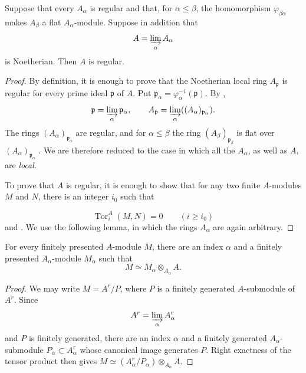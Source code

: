 \begin{proposition}[5.13.7]
\label{IV.5.13.7}
Suppose that every $A_\alpha$ is regular and that, for
$\alpha\leq\beta$, the homomorphism $\varphi_{\beta\alpha}$
makes $A_\beta$ a flat $A_\alpha$-module.  Suppose in addition
that
\[
  A=\varinjlim_\alpha A_\alpha
\]
is Noetherian.  Then $A$ is regular.
\end{proposition}

\begin{proof}
By definition, it is enough to prove that the Noetherian local
ring $A_{\mathfrak p}$ is regular for every prime ideal
$\mathfrak p$ of $A$.  Put $\mathfrak p_\alpha
=\varphi_\alpha^{-1}(\mathfrak p)$.
By ,
\[
  \mathfrak p=\varinjlim_\alpha\mathfrak p_\alpha,
  \qquad
  A_{\mathfrak p}
  =\varinjlim_\alpha((A_\alpha)_{\mathfrak p_\alpha}).
\]
The rings $(A_\alpha)_{\mathfrak p_\alpha}$ are regular, and for
$\alpha\leq\beta$ the ring
$(A_\beta)_{\mathfrak p_\beta}$ is flat over
$(A_\alpha)_{\mathfrak p_\alpha}$ .  We are
therefore reduced to the case in which all the $A_\alpha$, as
well as $A$, are \emph{local}.

To prove that $A$ is regular, it is enough to show that for any
two finite $A$-modules $M$ and $N$, there is an integer $i_0$
such that


\[
  \operatorname{Tor}^{A}_i(M,N)=0
  \qquad(i\geq i_0)
\]
 and .  We use the following
lemma, in which the rings $A_\alpha$ are again arbitrary.
\end{proof}

\begin{lemma}[5.13.7.1]
\label{IV.5.13.7.1}
For every finitely presented $A$-module $M$, there are an index
$\alpha$ and a finitely presented $A_\alpha$-module $M_\alpha$
such that
\[
  M\simeq M_\alpha\otimes_{A_\alpha}A.
\]
\end{lemma}

\begin{proof}
We may write $M=A^r/P$, where $P$ is a finitely generated
$A$-submodule of $A^r$.  Since
\[
  A^r=\varinjlim_\alpha A_\alpha^r
\]
and $P$ is finitely generated, there are an index $\alpha$ and a
finitely generated $A_\alpha$-submodule
$P_\alpha\subset A_\alpha^r$ whose canonical image generates
$P$.  Right exactness of the tensor product then gives $M
\simeq
(A_\alpha^r/P_\alpha)\otimes_{A_\alpha}A$.
\end{proof}

